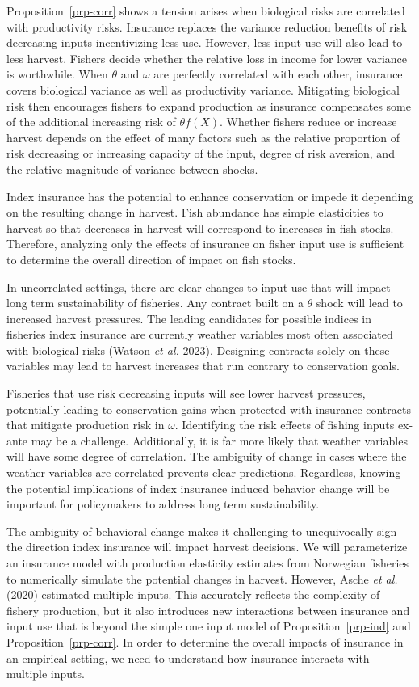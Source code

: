 \documentclass[
  letterpaper,
  DIV=11,
  numbers=noendperiod]{scrartcl}
\theoremstyle{plain}
\theoremstyle{plain}
\theoremstyle{remark}
\begin{document}
Proposition~\ref{prp-corr} shows a tension arises when biological risks
are correlated with productivity risks. Insurance replaces the variance
reduction benefits of risk decreasing inputs incentivizing less use.
However, less input use will also lead to less harvest. Fishers decide
whether the relative loss in income for lower variance is worthwhile.
When \(\theta\) and \(\omega\) are perfectly correlated with each other,
insurance covers biological variance as well as productivity variance.
Mitigating biological risk then encourages fishers to expand production
as insurance compensates some of the additional increasing risk of
\(\theta f(X)\). Whether fishers reduce or increase harvest depends on
the effect of many factors such as the relative proportion of risk
decreasing or increasing capacity of the input, degree of risk aversion,
and the relative magnitude of variance between shocks.

Index insurance has the potential to enhance conservation or impede it
depending on the resulting change in harvest. Fish abundance has simple
elasticities to harvest so that decreases in harvest will correspond to
increases in fish stocks. Therefore, analyzing only the effects of
insurance on fisher input use is sufficient to determine the overall
direction of impact on fish stocks.

In uncorrelated settings, there are clear changes to input use that will
impact long term sustainability of fisheries. Any contract built on a
\(\theta\) shock will lead to increased harvest pressures. The leading
candidates for possible indices in fisheries index insurance are
currently weather variables most often associated with biological risks
(Watson \emph{et al.} 2023). Designing contracts solely on these
variables may lead to harvest increases that run contrary to
conservation goals.

Fisheries that use risk decreasing inputs will see lower harvest
pressures, potentially leading to conservation gains when protected with
insurance contracts that mitigate production risk in \(\omega\).
Identifying the risk effects of fishing inputs ex-ante may be a
challenge. Additionally, it is far more likely that weather variables
will have some degree of correlation. The ambiguity of change in cases
where the weather variables are correlated prevents clear predictions.
Regardless, knowing the potential implications of index insurance
induced behavior change will be important for policymakers to address
long term sustainability.

The ambiguity of behavioral change makes it challenging to unequivocally
sign the direction index insurance will impact harvest decisions. We
will parameterize an insurance model with production elasticity
estimates from Norwegian fisheries to numerically simulate the potential
changes in harvest. However, Asche \emph{et al.} (2020) estimated
multiple inputs. This accurately reflects the complexity of fishery
production, but it also introduces new interactions between insurance
and input use that is beyond the simple one input model of
Proposition~\ref{prp-ind} and Proposition~\ref{prp-corr}. In order to
determine the overall impacts of insurance in an empirical setting, we
need to understand how insurance interacts with multiple inputs.
\end{document}
